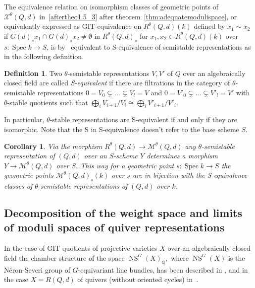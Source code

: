 \documentclass[10pt,a4paper]{amsart}
\newtheorem{coro}[theo]{Corollary}
\theoremstyle{definition}
\newtheorem{defi}[theo]{Definition}
\def\Q{\mathds Q}
\DeclareMathOperator{\Spec}{Spec}
\DeclareMathOperator{\NS}{NS}
\begin{document}
The equivalence relation on isomorphism classes of geometric points of 
$\mathcal X^\theta(Q,d)$ in~\ref{aftertheo1.5_3} after theorem~\ref{thm:adequatemodulispace},
or equivalently expressed as GIT-equivalence on $R^\theta(Q,d)(k)$
defined by $x_1\sim x_2$ if 
$\overline{G(d)_sx_1}\cap\overline{G(d)_sx_2}\neq\emptyset$
in $R^\theta(Q,d)_s$ for $x_1,x_2\in R^\theta(Q,d)(k)$ 
over $s\colon\Spec k\to S$, 
is by~\cite{Ki94} equivalent to S-equivalence of semistable representations 
as in the following definition.

\begin{defi}
Two $\theta$-semistable representations $V,V'$ of $Q$ over an algebraically 
closed field are called {\it S-equivalent} if there are filtrations in the 
category of $\theta$-semistable representations
$0=V_0\subsetneq\ldots\subsetneq V_l=V$ and $0=V'_0\subsetneq\ldots\subsetneq V'_l=V'$ 
with $\theta$-stable quotients such that 
$\bigoplus_iV_{i+1}/V_i\cong\bigoplus_iV'_{i+1}/V'_i$.
\end{defi}

In particular, $\theta$-stable representations are S-equivalent 
if and only if they are isomorphic. Note that the S in S-equivalence doesn't 
refer to the base scheme $S$.

\begin{coro}
Via the morphism $R^\theta(Q,d)\to\mathcal M^\theta(Q,d)$
any $\theta$-semistable representation of $(Q,d)$ over an $S$-scheme $Y$
determines a morphism $Y\to\mathcal M^\theta(Q,d)$ over $S$.
This way for a geometric point $s\colon\Spec k\to S$ the geometric points 
$\mathcal M^\theta(Q,d)_s(k)$ over $s$ are in bijection with 
the S-equivalence classes of $\theta$-semistable representations
of $(Q,d)$ over $k$.
\end{coro}


\subsection{Decomposition of the weight space and limits of moduli spaces of quiver representations}
\label{subsec:weightspace-limitfunctor}

In the case of GIT quotients of projective varieties $X$ over an algebraically closed 
field the chamber structure of the space $\NS^G(X)_\Q,$ where $\NS^G(X)$ is the 
N\'eron-Severi group of $G$-equivariant line bundles, has been described in 
\cite{Th96, DH98, Re00}, and in the case $X=R(Q,d)$ of quivers 
(without oriented cycles) in~\cite{HP02, Ch08}. 
\end{document}
